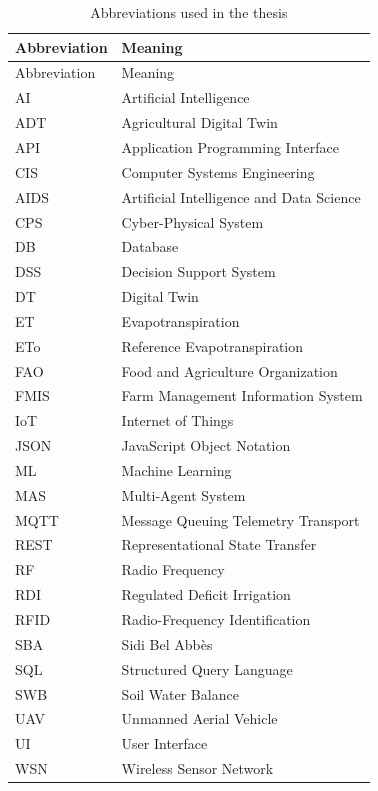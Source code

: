 \begin{footnotesize}
\setlength{\tabcolsep}{2pt}
\begin{longtable}{@{}>{\raggedright\arraybackslash}p{}>{\raggedright\arraybackslash}p{}@{}}
\caption{Abbreviations used in the thesis}\\
\toprule
Abbreviation & Meaning \\
\midrule
\endfirsthead
\toprule
Abbreviation & Meaning \\
\midrule
\endhead
AI & Artificial Intelligence \\
ADT & Agricultural Digital Twin \\
API & Application Programming Interface \\
CIS & Computer Systems Engineering \\
AIDS & Artificial Intelligence and Data Science \\
CPS & Cyber-Physical System \\
DB & Database \\
DSS & Decision Support System \\
DT & Digital Twin \\
ET & Evapotranspiration \\
ETo & Reference Evapotranspiration \\
FAO & Food and Agriculture Organization \\
FMIS & Farm Management Information System \\
IoT & Internet of Things \\
JSON & JavaScript Object Notation \\
ML & Machine Learning \\
MAS & Multi-Agent System \\
MQTT & Message Queuing Telemetry Transport \\
REST & Representational State Transfer \\
RF & Radio Frequency \\
RDI & Regulated Deficit Irrigation \\
RFID & Radio-Frequency Identification \\
SBA & Sidi Bel Abbès \\
SQL & Structured Query Language \\
SWB & Soil Water Balance \\
UAV & Unmanned Aerial Vehicle \\
UI & User Interface \\
WSN & Wireless Sensor Network \\
\bottomrule
\end{longtable}
\end{footnotesize}

\cleardoublepage
\tableofcontents
\cleardoublepage
\listoffigures
\cleardoublepage
\listoftables
\cleardoublepage

